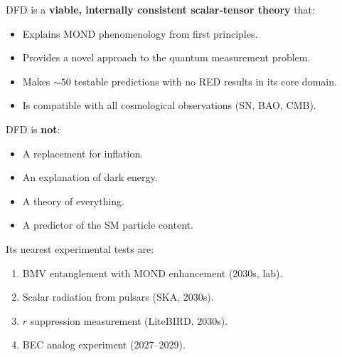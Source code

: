 \documentclass[11pt,a4paper]{article}
\begin{document}
DFD is a \textbf{viable, internally consistent scalar-tensor theory} that:
\begin{itemize}
\item Explains MOND phenomenology from first principles.
\item Provides a novel approach to the quantum measurement problem.
\item Makes $\sim 50$ testable predictions with no RED results in its core domain.
\item Is compatible with all cosmological observations (SN, BAO, CMB).
\end{itemize}

DFD is \textbf{not}:
\begin{itemize}
\item A replacement for inflation.
\item An explanation of dark energy.
\item A theory of everything.
\item A predictor of the SM particle content.
\end{itemize}

Its nearest experimental tests are:
\begin{enumerate}
\item BMV entanglement with MOND enhancement (2030s, lab).
\item Scalar radiation from pulsars (SKA, 2030s).
\item $r$ suppression measurement (LiteBIRD, 2030s).
\item BEC analog experiment (2027--2029).
\end{enumerate}
\end{document}
